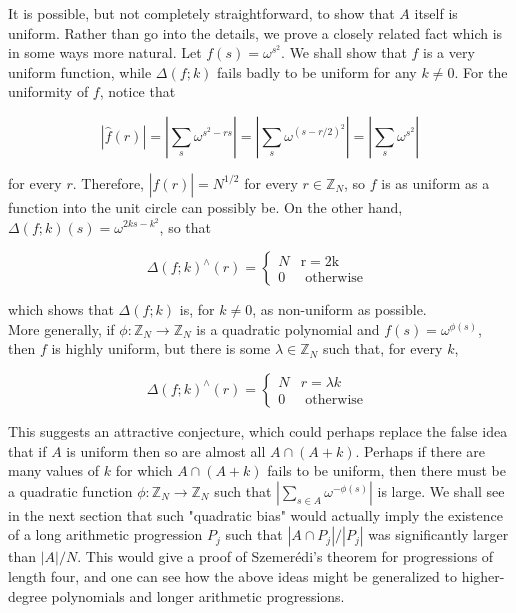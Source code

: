 \documentclass[10pt]{article}
\begin{document}
It is possible, but not completely straightforward, to show that $A$ itself is uniform. Rather than go into the details, we prove a closely related fact which is in some ways more natural. Let $f(s)=\omega^{s^{2}}$. We shall show that $f$ is a very uniform function, while $\Delta(f ; k)$ fails badly to be uniform for any $k \neq 0$. For the uniformity of $f$, notice that

$$
|\hat{f}(r)|=\left|\sum_{s} \omega^{s^{2}-r s}\right|=\left|\sum_{s} \omega^{(s-r / 2)^{2}}\right|=\left|\sum_{s} \omega^{s^{2}}\right|
$$

for every $r$. Therefore, $|\hat{f}(r)|=N^{1 / 2}$ for every $r \in \mathbb{Z}_{N}$, so $f$ is as uniform as a function into the unit circle can possibly be. On the other hand, $\Delta(f ; k)(s)=\omega^{2 k s-k^{2}}$, so that

$$
\Delta(f ; k)^{\wedge}(r)= \begin{cases}N & \mathrm{r}=2 \mathrm{k} \\ 0 & \text { otherwise }\end{cases}
$$

which shows that $\Delta(f ; k)$ is, for $k \neq 0$, as non-uniform as possible.\\
More generally, if $\phi: \mathbb{Z}_{N} \rightarrow \mathbb{Z}_{N}$ is a quadratic polynomial and $f(s)=\omega^{\phi(s)}$, then $f$ is highly uniform, but there is some $\lambda \in \mathbb{Z}_{N}$ such that, for every $k$,

$$
\Delta(f ; k)^{\wedge}(r)= \begin{cases}N & r=\lambda k \\ 0 & \text { otherwise }\end{cases}
$$

This suggests an attractive conjecture, which could perhaps replace the false idea that if $A$ is uniform then so are almost all $A \cap(A+k)$. Perhaps if there are many values of $k$ for which $A \cap(A+k)$ fails to be uniform, then there must be a quadratic function $\phi: \mathbb{Z}_{N} \rightarrow \mathbb{Z}_{N}$ such that $\left|\sum_{s \in A} \omega^{-\phi(s)}\right|$ is large. We shall see in the next section that such "quadratic bias" would actually imply the existence of a long arithmetic progression $P_{j}$ such that $\left|A \cap P_{j}\right| /\left|P_{j}\right|$ was significantly larger than $|A| / N$. This would give a proof of Szemerédi's theorem for progressions of length four, and one can see how the above ideas might be generalized to higher-degree polynomials and longer arithmetic progressions.
\end{document}
